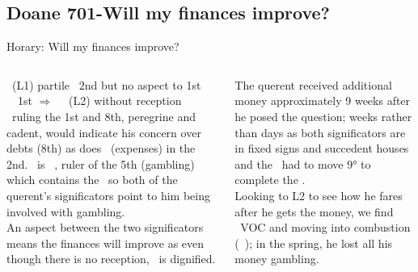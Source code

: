 \subsection{Doane 701-Will my finances improve?}
\begin{frame}[t]{Horary: Will my finances improve?}
\begin{columns}[T, onlytextwidth]
\footnotesize
{}
\Venus\ (L1) partile \Sextile\ 2nd but no aspect to 1st \\
\Moon\ \Trine\ 1st $\Rightarrow$ \Square\ \Mars\ (L2) without reception \\

\vspace{0.2cm}
\Venus\ ruling the 1st and 8th, peregrine and cadent, would indicate his concern over debts (8th) as does \Mars\ (expenses) in the 2nd.  \Venus\ is  \Opposition\ \Saturn, ruler of the 5th (gambling) which contains the \Moon\ so both of the querent's significators point to him being involved with gambling. \\

\vspace{0.2cm}
An aspect between the two significators means the finances will improve as even though there is no reception, \Mars\ is dignified.

\vspace{0.2cm}
The querent received additional money approximately 9 weeks after he posed the question; weeks rather than days as both significators are in fixed signs and succedent houses and the \Moon\ had to move 9° to complete the \Square.\\

\vspace{0.25cm}
Looking to L2 to see how he fares after he gets the money, we find \Mars\ VOC and moving into combustion (\Conjunction\ \Sun); in the spring, he lost all his money gambling.


\end{columns}
\end{frame}

